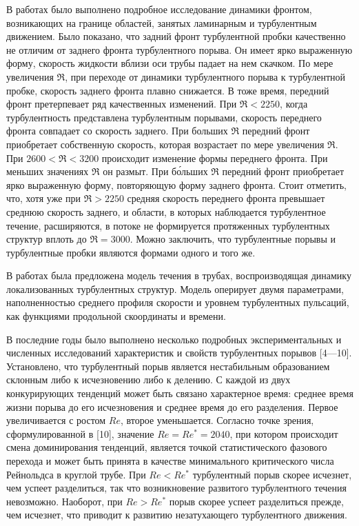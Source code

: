 В работах \cite{Moxey2010, Barkley2015, Song2017} было выполнено подробное исследование динамики фронтом, возникающих на границе областей, занятых ламинарным и турбулентным движением. Было показано, что задний фронт турбулентной пробки качественно не отличим от заднего фронта турбулентного порыва. Он имеет ярко выраженную форму, скорость жидкости вблизи оси трубы падает на нем скачком. По мере увеличения $\Re$, при переходе от динамики турбулентного порыва к турбулентной пробке, скорость заднего фронта плавно снижается. В тоже время, передний фронт претерпевает ряд качественных изменений. При $\Re < 2250$, когда турбулентность представлена турбулентным порывами, скорость переднего фронта совпадает со скорость заднего. При больших $\Re$ передний фронт приобретает собственную скорость, которая возрастает по мере увеличения $\Re$. При $2600 < \Re < 3200$ происходит изменение формы переднего фронта. При меньших значениях $\Re$ он размыт. При б\'{о}льших $\Re$ передний фронт приобретает ярко выраженную форму, повторяющую форму заднего фронта. Стоит отметить, что, хотя уже при $\Re > 2250$ средняя скорость переднего фронта превышает среднюю скорость заднего, и области, в которых наблюдается турбулентное течение, расширяются, в потоке не формируется протяженных турбулентных структур вплоть до $\Re = 3000$. Можно заключить, что турбулентные порывы и турбулентные пробки являются формами одного и того же. 

В работах \cite{Barkley2015, Barkley2016} была предложена модель течения в трубах, воспроизводящая динамику локализованных турбулентных структур. Модель оперирует двумя параметрами, наполненностью среднего профиля скорости и уровнем турбулентных пульсаций, как функциями продольной скоординаты и времени. 

В последние годы было выполнено несколько подробных экспериментальных и численных исследований характеристик и свойств турбулентных порывов [4---10]. Установлено, что турбулентный порыв является нестабильным образованием склонным либо к исчезновению либо к делению. С каждой из двух конкурирующих тенденций может быть связано характерное время: среднее время жизни порыва до его исчезновения и среднее время до его разделения. Первое увеличивается с ростом $Re$, второе уменьшается. Согласно точке зрения, сформулированной в [10], значение $Re=Re^*=2040$, при котором происходит смена доминирования тенденций, является точкой статистического фазового перехода и может быть принята в качестве минимального критического числа Рейнольдса в круглой трубе. При $Re<Re^*$ турбулентный порыв скорее исчезнет, чем успеет разделиться, так что возникновение развитого турбулентного течения невозможно. Наоборот, при $Re>Re^*$ порыв скорее успеет разделиться прежде, чем исчезнет, что приводит к развитию незатухающего турбулентного движения.

